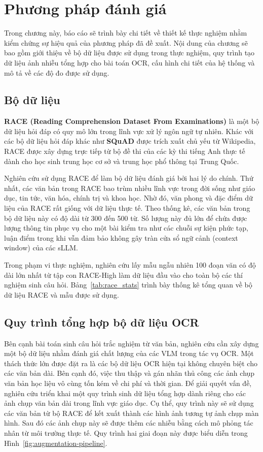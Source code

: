 \chapter{Phương pháp đánh giá}
\label{chap:phuong-phap-danh-gia}

Trong chương này, báo cáo sẽ trình bày chi tiết về thiết kế thực nghiệm nhằm kiểm chứng sự hiệu quả của phương pháp đã đề xuất. Nội dung của chương sẽ bao gồm giới thiệu về bộ dữ liệu được sử dụng trong thực nghiệm, quy trình tạo dữ liệu ảnh nhiễu tổng hợp cho bài toán OCR, cấu hình chi tiết của hệ thống và mô tả về các độ đo được sử dụng.

\section{Bộ dữ liệu}

\textbf{RACE (Reading Comprehension Dataset From Examinations)} \cite{lai2017race} là một bộ dữ liệu hỏi đáp có quy mô lớn trong lĩnh vực xử lý ngôn ngữ tự nhiên. Khác với các bộ dữ liệu hỏi đáp khác như \textbf{SQuAD} \cite{rajpurkar2016squad} được trích xuất chủ yếu từ Wikipedia, RACE được xây dựng trực tiếp từ bộ đề thi của các kỳ thi tiếng Anh thực tế dành cho học sinh trung học cơ sở và trung học phổ thông tại Trung Quốc.

Nghiên cứu sử dụng RACE để làm bộ dữ liệu đánh giá bởi hai lý do chính. Thứ nhất, các văn bản trong RACE bao trùm nhiều lĩnh vực trong đời sống như giáo dục, tin tức, văn hóa, chính trị và khoa học. Nhờ đó, văn phong và đặc điểm dữ liệu của RACE rất giống với dữ liệu thực tế. Theo thống kê, các văn bản trong bộ dữ liệu này có độ dài từ 300 đến 500 từ. Số lượng này đủ lớn để chứa được lượng thông tin phục vụ cho một bài kiểm tra như các chuỗi sự kiện phức tạp, luận điểm trong khi vẫn đảm bảo không gây tràn cửa sổ ngữ cảnh (context window) của các sLLM.

Trong phạm vi thực nghiệm, nghiên cứu lấy mẫu ngẫu nhiên 100 đoạn văn có độ dài lớn nhất từ tập con RACE-High làm dữ liệu đầu vào cho toàn bộ các thí nghiệm sinh câu hỏi. Bảng~\ref{tab:race_stats} trình bày thống kê tổng quan về bộ dữ liệu RACE và mẫu được sử dụng.

\section{Quy trình tổng hợp bộ dữ liệu OCR}

Bên cạnh bài toán sinh câu hỏi trắc nghiệm từ văn bản, nghiên cứu cần xây dựng một bộ dữ liệu nhằm đánh giá chất lượng của các VLM trong tác vụ OCR. Một thách thức lớn được đặt ra là các bộ dữ liệu OCR hiện tại không chuyên biệt cho các văn bản dài. Bên cạnh đó, việc thu thập và gán nhãn thủ công các ảnh chụp văn bản học liệu vô cùng tốn kém về chi phí và thời gian. Để giải quyết vấn đề, nghiên cứu triển khai một quy trình sinh dữ liệu tổng hợp dành riêng cho các ảnh chụp văn bản dài trong lĩnh vực giáo dục. Cụ thể, quy trình này sẽ sử dụng các văn bản từ bộ RACE để kết xuất thành các hình ảnh tương tự ảnh chụp màn hình. Sau đó các ảnh chụp này sẽ được thêm các nhiễu bằng cách mô phỏng tác nhân từ môi trường thực tế. Quy trình hai giai đoạn này được biểu diễn trong Hình~\ref{fig:augmentation-pipeline}.

